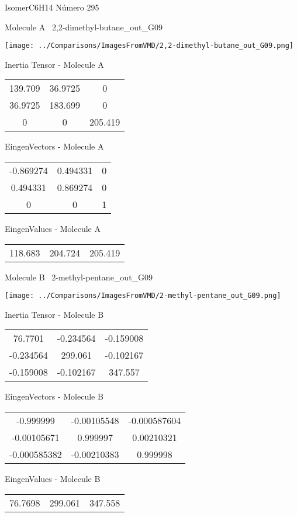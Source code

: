 \vtab[-3cm]
\begin{center}
{\large IsomerC6H14 \tab Número 295}
\end{center}
\begin{multicols}{2}
\begin{center}

Molecule A \
2,2-dimethyl-butane\_out\_G09

\texttt{[image: ../Comparisons/ImagesFromVMD/2,2-dimethyl-butane\_out\_G09.png]}

Inertia Tensor - Molecule A \\
\begin{tabular}{|c c c|}
139.709	 & 	36.9725	 & 	0	 \\
36.9725	 & 	183.699	 & 	0	 \\
0	 & 	0	 & 	205.419
\end{tabular}

\vtab
 EingenVectors - Molecule A     \\
\begin{tabular}{|c c c|}
-0.869274	 & 	0.494331	 & 	0	 \\
0.494331	 & 	0.869274	 & 	0	 \\
0	 & 	0	 & 	1
\end{tabular}

\vtab
 EingenValues - Molecule A     \\
\begin{tabular}{|c c c|}
118.683	 & 	204.724	 & 	205.419	 \\
\end{tabular}
\columnbreak

Molecule B \
2-methyl-pentane\_out\_G09

\texttt{[image: ../Comparisons/ImagesFromVMD/2-methyl-pentane\_out\_G09.png]}

Inertia Tensor - Molecule B \\
\begin{tabular}{|c c c|}
76.7701	 & 	-0.234564	 & 	-0.159008	 \\
-0.234564	 & 	299.061	 & 	-0.102167	 \\
-0.159008	 & 	-0.102167	 & 	347.557
\end{tabular}

\vtab
 EingenVectors - Molecule B     \\
\begin{tabular}{|c c c|}
-0.999999	 & 	-0.00105548	 & 	-0.000587604	 \\
-0.00105671	 & 	0.999997	 & 	0.00210321	 \\
-0.000585382	 & 	-0.00210383	 & 	0.999998
\end{tabular}

\vtab
 EingenValues - Molecule B     \\
\begin{tabular}{|c c c|}
76.7698	 & 	299.061	 & 	347.558	 \\
\end{tabular}

\end{center}
\end{multicols}

